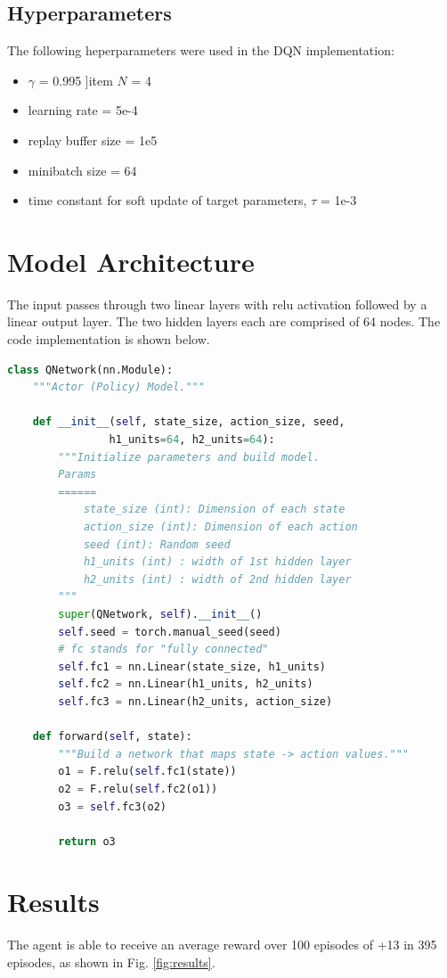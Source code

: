 \documentclass{article}
\begin{document}
\subsection{Hyperparameters}
The following heperparameters were used in the DQN implementation:

\begin{itemize}
\item  $\gamma$ = 0.995
]item $N$ = 4
\item learning rate = 5e-4
\item replay buffer size  = 1e5
\item minibatch size = 64
\item time constant for soft update of target parameters, $\tau$ = 1e-3
\end{itemize}


\section{Model Architecture}
The input passes through two linear layers with relu activation followed by a linear output layer. The two hidden layers each are comprised of 64 nodes. The code implementation is shown below. 

\begin{lstlisting}[language=Python]
class QNetwork(nn.Module):
    """Actor (Policy) Model."""

    def __init__(self, state_size, action_size, seed,
                h1_units=64, h2_units=64):
        """Initialize parameters and build model.
        Params
        ======
            state_size (int): Dimension of each state
            action_size (int): Dimension of each action
            seed (int): Random seed
            h1_units (int) : width of 1st hidden layer
            h2_units (int) : width of 2nd hidden layer
        """
        super(QNetwork, self).__init__()
        self.seed = torch.manual_seed(seed)
        # fc stands for "fully connected"
        self.fc1 = nn.Linear(state_size, h1_units)
        self.fc2 = nn.Linear(h1_units, h2_units)
        self.fc3 = nn.Linear(h2_units, action_size)

    def forward(self, state):
        """Build a network that maps state -> action values."""
        o1 = F.relu(self.fc1(state))
        o2 = F.relu(self.fc2(o1))
        o3 = self.fc3(o2)
        
        return o3
\end{lstlisting}

\section{Results}
The agent is able to receive an average reward over 100 episodes of +13 in 395 episodes, as shown in Fig. \ref{fig:results}.
\end{document}
